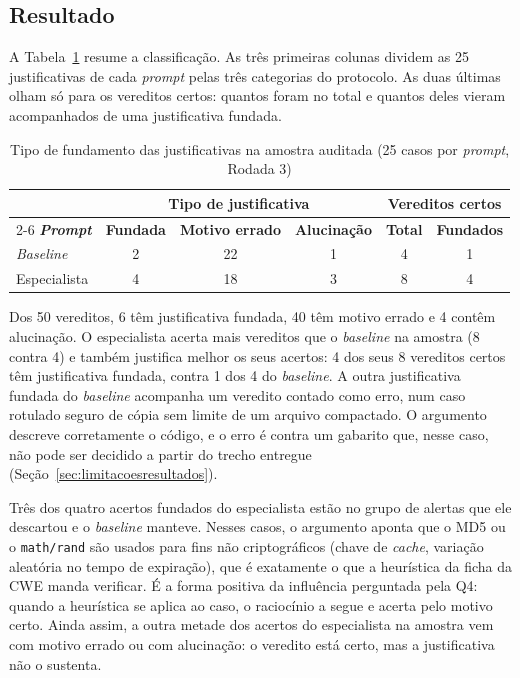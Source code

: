 \subsection{Resultado}
\label{subsec:q4resultado}

A Tabela~\ref{tab:q4} resume a classificação. As três primeiras colunas dividem as 25 justificativas de cada \textit{prompt} pelas três categorias do protocolo. As duas últimas olham só para os vereditos certos: quantos foram no total e quantos deles vieram acompanhados de uma justificativa fundada.

\begin{table}[htpb]
    \centering
    \caption[Tipo de fundamento das justificativas auditadas]{Tipo de fundamento das justificativas na amostra auditada (25 casos por \textit{prompt}, Rodada 3)}
    \label{tab:q4}
    \renewcommand{\arraystretch}{1.4}
    \begin{tabular}{|l|c|c|c|c|c|}
        \hline
         & \multicolumn{3}{c|}{\textbf{Tipo de justificativa}} & \multicolumn{2}{c|}{\textbf{Vereditos certos}} \\
        \cline{2-6}
        \textbf{\textit{Prompt}} & \textbf{Fundada} & \textbf{Motivo errado} & \textbf{Alucinação} & \textbf{Total} & \textbf{Fundados} \\
        \hline
        \textit{Baseline} & 2 & 22 & 1 & 4 & 1 \\
        \hline
        Especialista & 4 & 18 & 3 & 8 & 4 \\
        \hline
    \end{tabular}
    \fontepesquisa
\end{table}

Dos 50 vereditos, 6 têm justificativa fundada, 40 têm motivo errado e 4 contêm alucinação. O especialista acerta mais vereditos que o \textit{baseline} na amostra (8 contra 4) e também justifica melhor os seus acertos: 4 dos seus 8 vereditos certos têm justificativa fundada, contra 1 dos 4 do \textit{baseline}. A outra justificativa fundada do \textit{baseline} acompanha um veredito contado como erro, num caso rotulado seguro de cópia sem limite de um arquivo compactado. O argumento descreve corretamente o código, e o erro é contra um gabarito que, nesse caso, não pode ser decidido a partir do trecho entregue (Seção~\ref{sec:limitacoesresultados}).

Três dos quatro acertos fundados do especialista estão no grupo de alertas que ele descartou e o \textit{baseline} manteve. Nesses casos, o argumento aponta que o MD5 ou o \texttt{math/rand} são usados para fins não criptográficos (chave de \textit{cache}, variação aleatória no tempo de expiração), que é exatamente o que a heurística da ficha da CWE manda verificar. É a forma positiva da influência perguntada pela Q4: quando a heurística se aplica ao caso, o raciocínio a segue e acerta pelo motivo certo. Ainda assim, a outra metade dos acertos do especialista na amostra vem com motivo errado ou com alucinação: o veredito está certo, mas a justificativa não o sustenta.

